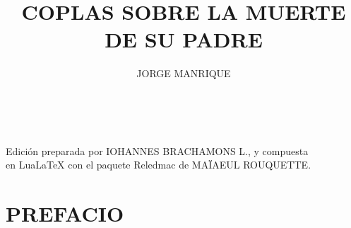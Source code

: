 \documentclass[11pt,a4paper,twoside]{article}
\title{COPLAS SOBRE LA MUERTE DE SU PADRE}
\author{\fontsize{14}{11.96}\selectfont JORGE MANRIQUE}
\date{\vspace{60pt}\fontsize{11}{11}\selectfont{EDICIÓN CRÍTICA LIMINAR}\\\fontsize{40}{11}\selectfont{\vfill\LaTeX}}
\begin{document}
	{
	\maketitle
}
	\newpage
%
\hskip0pt
\vfill
\begin{flushright}
	Edición preparada por {\fontsize{9}{1}\selectfont IOHANNES BRACHAMONS L}., y compuesta\\ en LuaLaTeX con el paquete Reledmac de {\fontsize{9}{11}\selectfont MAÏAEUL ROUQUETTE}.
\end{flushright}
\newpage
%
\tableofcontents
\newpage
%
\setcounter{page}{1}
\section*{\centering\fontsize{11}{14}\selectfont PREFACIO}
\end{document}
